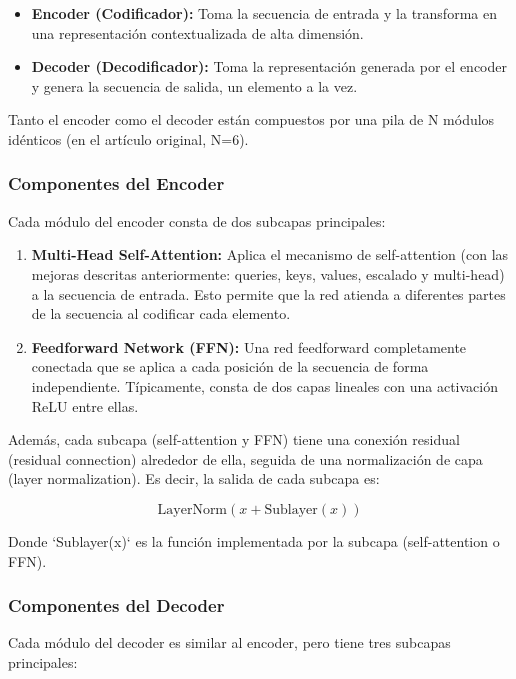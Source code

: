 \documentclass{article}
\begin{document}
\begin{itemize}
    \item \textbf{Encoder (Codificador):}  Toma la secuencia de entrada y la transforma en una representación contextualizada de alta dimensión.
    \item \textbf{Decoder (Decodificador):}  Toma la representación generada por el encoder y genera la secuencia de salida, un elemento a la vez.
\end{itemize}

Tanto el encoder como el decoder están compuestos por una pila de N módulos idénticos (en el artículo original, N=6).

\subsubsection{Componentes del Encoder}

Cada módulo del encoder consta de dos subcapas principales:

\begin{enumerate}
    \item \textbf{Multi-Head Self-Attention:}  Aplica el mecanismo de self-attention (con las mejoras descritas anteriormente: queries, keys, values, escalado y multi-head) a la secuencia de entrada.  Esto permite que la red atienda a diferentes partes de la secuencia al codificar cada elemento.
    \item \textbf{Feedforward Network (FFN):}  Una red feedforward completamente conectada que se aplica a cada posición de la secuencia de forma independiente.  Típicamente, consta de dos capas lineales con una activación ReLU entre ellas.
\end{enumerate}

Además, cada subcapa (self-attention y FFN) tiene una conexión residual (residual connection) alrededor de ella, seguida de una normalización de capa (layer normalization).  Es decir, la salida de cada subcapa es:

\[
\text{LayerNorm}(x + \text{Sublayer}(x))
\]

Donde `Sublayer(x)` es la función implementada por la subcapa (self-attention o FFN).

\subsubsection{Componentes del Decoder}

Cada módulo del decoder es similar al encoder, pero tiene tres subcapas principales:
\end{document}
